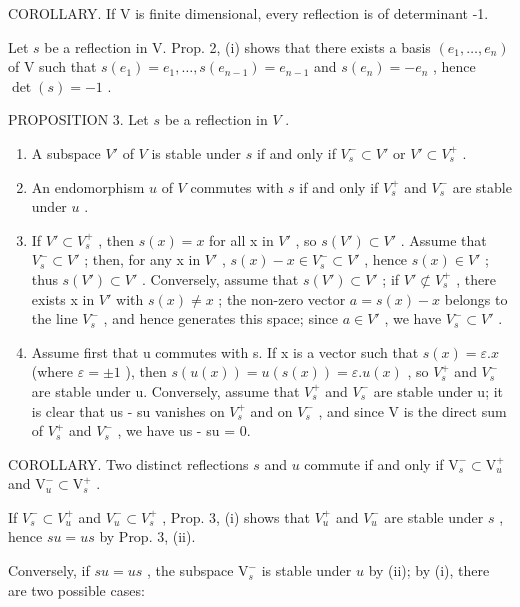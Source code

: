 COROLLARY. If V is finite dimensional, every reflection is of determinant -1.

Let \(s\) be a reflection in V. Prop. 2, (i) shows that there exists a basis \((e_1, \ldots, e_n)\) of V such that \(s(e_1) = e_1, \ldots, s(e_{n-1}) = e_{n-1}\) and \(s(e_n) = -e_n\) , hence \(\det(s) = -1\) .

PROPOSITION 3. Let \(s\) be a reflection in \(V\) .

\begin{enumerate}
\def\labelenumi{(\roman{enumi})}
\item
  A subspace \(V'\) of \(V\) is stable under \(s\) if and only if \(V_s^- \subset V'\) or \(V' \subset V_s^+\) .
\item
  An endomorphism \(u\) of \(V\) commutes with \(s\) if and only if \(V_s^+\) and \(V_s^-\) are stable under \(u\) .
\item
  If \(V' \subset V_{s}^{+}\) , then \(s(x) = x\) for all x in \(V'\) , so \(s(V') \subset V'\) . Assume that \(V_{s}^{-} \subset V'\) ; then, for any x in \(V'\) , \(s(x) - x \in V_{s}^{-} \subset V'\) , hence \(s(x) \in V'\) ; thus \(s(V') \subset V'\) . Conversely, assume that \(s(V') \subset V'\) ; if \(V' \not\subset V_{s}^{+}\) , there exists x in \(V'\) with \(s(x) \neq x\) ; the non-zero vector \(a = s(x) - x\) belongs to the line \(V_{s}^{-}\) , and hence generates this space; since \(a \in V'\) , we have \(V_{s}^{-} \subset V'\) .
\item
  Assume first that u commutes with s. If x is a vector such that \(s(x) = \varepsilon.x\) (where \(\varepsilon = \pm1\) ), then \(s(u(x)) = u(s(x)) = \varepsilon.u(x)\) , so \(V_{s}^{+}\) and \(V_{s}^{-}\) are stable under u. Conversely, assume that \(V_{s}^{+}\) and \(V_{s}^{-}\) are stable under u; it is clear that us - su vanishes on \(V_{s}^{+}\) and on \(V_{s}^{-}\) , and since V is the direct sum of \(V_{s}^{+}\) and \(V_{s}^{-}\) , we have us - su = 0.
\end{enumerate}

COROLLARY. Two distinct reflections \(s\) and \(u\) commute if and only if \(\mathrm{V}_s^- \subset \mathrm{V}_u^+\) and \(\mathrm{V}_u^- \subset \mathrm{V}_s^+\) .

If \(V_{s}^{-} \subset V_{u}^{+}\) and \(V_{u}^{-} \subset V_{s}^{+}\) , Prop. 3, (i) shows that \(V_{u}^{+}\) and \(V_{u}^{-}\) are stable under \(s\) , hence \(su = us\) by Prop. 3, (ii).

Conversely, if \(su = us\) , the subspace \(\mathrm{V}_{s}^{-}\) is stable under \(u\) by (ii); by (i), there are two possible cases:

